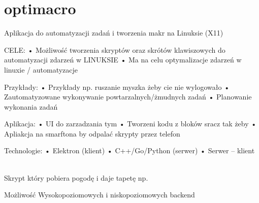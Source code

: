 \chapter{optimacro}
\hypertarget{index}{}\label{index}
\label{index_md__2home_2pawel_2Pulpit_2optimacro__repo_2README}%
%


Aplikacja do automatyzacji zadań i tworzenia makr na Linuksie (X11)

CELE\+: • Możliwość tworzenia skryptów oraz skrótów klawiszowych do automatyzacji zdarzeń w LINUKSIE • Ma na celu optymalizacje zdarzeń w linuxie / automatyzacje

Przykłady\+: • Przykłady np. ruszanie myszka żeby cie nie wylogowało • Zautomatyzowane wykonywanie powtarzalnych/żmudnych zadań • Planowanie wykonania zadań

Aplikacja\+: • UI do zarzadzania tym • Tworzeni kodu z bloków sracz tak żeby • Apliakcja na smarftona by odpalać skrypty przez telefon

Technologie\+: • Elektron (klient) • C++/\+Go/\+Python (serwer) • Serwer – klient ~\newline


Skrypt który pobiera pogodę i daje tapetę np.

Możliwość Wysokopoziomowych i niskopoziomowych backend 